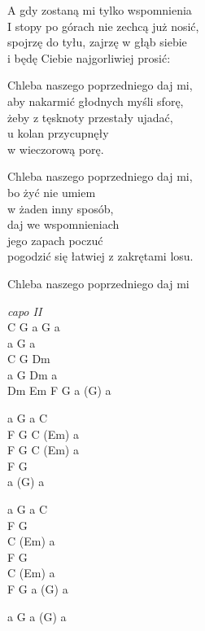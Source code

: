 \begin{text}
\hfill\break
\hfill\break
A gdy zostaną mi tylko wspomnienia\\
I stopy po górach nie zechcą już nosić,\\
spojrzę do tyłu, zajrzę w głąb siebie\\
i będę Ciebie najgorliwiej prosić:

\hfill\break
Chleba naszego poprzedniego daj mi,\\
aby nakarmić głodnych myśli sforę,\\
żeby z tęsknoty przestały ujadać,\\
u kolan przycupnęły\\
w wieczorową porę.

Chleba naszego poprzedniego daj mi,\\
bo żyć nie umiem\\
w żaden inny sposób,\\
daj we wspomnieniach\\
jego zapach poczuć\\
pogodzić się łatwiej z zakrętami losu.

Chleba naszego poprzedniego daj mi\\
\end{text}
\begin{chord}
\textit{capo II}\\
C G a G a\\
a G a\\
C G Dm\\
a G Dm a\\
Dm Em F G a (G) a

a G a C\\
F G C (Em) a\\
F G C (Em) a\\
F G\\
a (G) a

a G a C\\
F G\\
C (Em) a\\
F G\\
C (Em) a\\
F G a (G) a

a G a (G) a
\end{chord}
